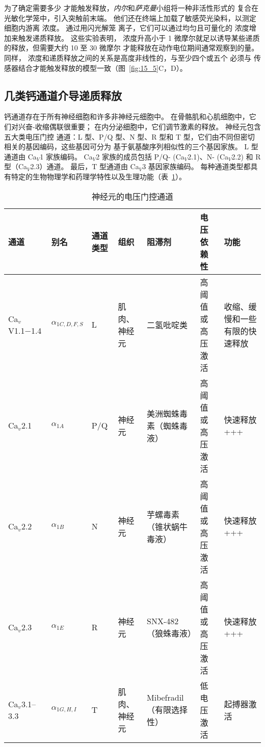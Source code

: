 为了确定需要多少  才能触发释放，\textit{内尔}和\textit{萨克曼}小组将一种非活性形式的  复合在光敏化学笼中，引入突触前末端。
他们还在终端上加载了敏感荧光染料，以测定细胞内游离  浓度。
通过用闪光解笼  离子，它们可以通过均匀且可量化的  浓度增加来触发递质释放。
这些实验表明， 浓度升高小于 1 微摩尔就足以诱导某些递质的释放，但需要大约 10 至 30 微摩尔  才能释放在动作电位期间通常观察到的量。
同样， 浓度和递质释放之间的关系是高度非线性的，与至少四个或五个  必须与  传感器结合才能触发释放的模型一致（图~\ref{fig:15_5}C，D）。



\subsection{几类钙通道介导递质释放}

钙通道存在于所有神经细胞和许多非神经元细胞中。 
在骨骼肌和心肌细胞中，它们对兴奋-收缩偶联很重要；
在内分泌细胞中，它们调节激素的释放。
神经元包含五大类电压门控  通道：L 型、P/Q 型、N 型、R 型和 T 型，它们由不同但密切相关的基因编码，这些基因可分为 基于氨基酸序列相似性的三个基因家族。
L 型通道由 Ca$_V$1 家族编码。
Ca$_V$2 家族的成员包括 P/Q- (Ca$_V$2.1)、N- (Ca$_V$2.2) 和 R 型（Ca$_V$2.3）通道。
最后，T 型通道由 Ca$_V$3 基因家族编码。 
每种通道类型都具有特定的生物物理学和药理学特性以及生理功能（表~\ref{tab:15_1}）。


\begin{table}[htbp]
	\caption{神经元的电压门控通道} \label{tab:15_1} \centering
	\begin{tabular}{lllllll}
		\toprule
		通道 & 别名 & \ce{Ca^2+}通道类型 & 组织 & 阻滞剂 & 电压依赖性 & 功能\\
		\midrule
		Ca$_v$V1.1−1.4 & $\alpha_{1C,D,F,S}$ & L & 肌肉、神经元 & 二氢吡啶类 & 高阈值或高压激活 & 收缩、缓慢和一些有限的快速释放 \\
		Ca$_v$2.1 & $\alpha_{1A}$ & P/Q & 神经元 & 美洲蜘蛛毒素（蜘蛛毒液） & 高阈值或高压激活 & 快速释放 +++ \\
		Ca$_v$2.2 & $\alpha_{1B}$ & N & 神经元 & 芋螺毒素（锥状蜗牛毒液） & 高阈值或高压激活 & 快速释放 +++ \\
		Ca$_v$2.3 & $\alpha_{1E}$ & R & 神经元 & SNX-482（狼蛛毒液） & 高阈值或高压激活 & 快速释放 +++ \\
		Ca$_v$3.1–3.3 & $\alpha_{1G,H,I}$ & T & 肌肉、神经元 & Mibefradil（有限选择性） & 低电压激活 & 起搏器激活 \\
		\bottomrule
	\end{tabular}
\end{table}


